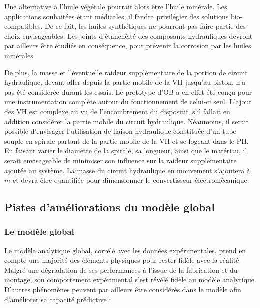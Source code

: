 Une alternative à l'huile végétale pourrait alors être l'huile minérale. Les applications souhaitées étant médicales, il faudra privilégier des solutions bio-compatibles. De ce fait, les huiles synthétiques ne pourront pas faire partie des choix envisageables. Les joints d’étanchéité des composants hydrauliques devront par ailleurs être étudiés en conséquence, pour prévenir la corrosion par les huiles minérales.

De plus, la masse et l'éventuelle raideur supplémentaire de la portion de circuit hydraulique, devant aller depuis la partie mobile de la VH jusqu'au piston, n'a pas été considérée durant les essais. Le prototype d'OB a en effet été conçu pour une instrumentation complète autour du fonctionnement de celui-ci seul. L'ajout des VH est complexe au vu de l'encombrement du dispositif, s'il fallait en addition considérer la partie mobile du circuit hydraulique. Néanmoins, il serait possible d'envisager l'utilisation de liaison hydraulique constituée d'un tube souple en spirale partant de la partie mobile de la VH et se logeant dans le PH. En faisant varier le diamètre de la spirale, sa longueur, ainsi que le matériau, il serait envisageable de minimiser son influence sur la raideur supplémentaire ajoutée au système. La masse du circuit hydraulique en mouvement s'ajoutera à $m$ et devra être quantifiée pour dimensionner le convertisseur électromécanique.
   \subsection{Pistes d'améliorations du modèle global}
   \label{subsec:6.4.2}
		\subsubsection{Le modèle global}
		\label{subsec:6.4.2.a}
Le modèle analytique global, corrélé avec les données expérimentales, prend en compte une majorité des éléments physiques pour rester fidèle avec la réalité. Malgré une dégradation de ses performances à l'issue de la fabrication et du montage, son comportement expérimental s'est révélé fidèle au modèle analytique. D'autres phénomènes peuvent par ailleurs être considérés dans le modèle afin d'améliorer sa capacité prédictive : 

